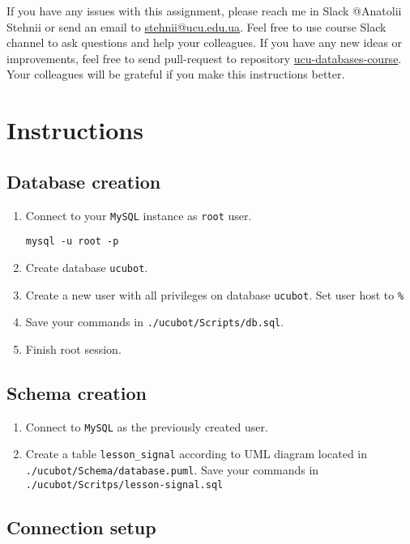 \documentclass[12pt]{article}
\newcommand{\code}[1]{\texttt{#1}}
\begin{document}
If you have any issues with this assignment, please reach me in Slack @Anatolii Stehnii or send an email to \href{mailto:stehnii@ucu.edu.ua}{stehnii@ucu.edu.ua}. Feel free to use course Slack channel to ask questions and help your colleagues. If you have any new ideas or improvements, feel free to send pull-request to repository \href{https://github.com/tsdaemon/ucu-databases-course}{ucu-databases-course}. Your colleagues will be grateful if you make this instructions better.

\section*{Instructions}
\subsection*{Database creation}

\begin{enumerate}
\item Connect to your \code{MySQL} instance as \code{root} user.
\begin{verbatim}
mysql -u root -p
\end{verbatim}
\item Create database \code{ucubot}.
\item Create a new user with all privileges on database \code{ucubot}. Set user host to \code{\%}
\item Save your commands in \code{./ucubot/Scripts/db.sql}.
\item Finish root session.
\end{enumerate}

\subsection*{Schema creation}

\begin{enumerate}
\item Connect to \code{MySQL} as the previously created user.
\item Create a table \code{lesson\_signal} according to UML diagram located in \break \code{./ucubot/Schema/database.puml}. Save your commands in \break \code{./ucubot/Scritps/lesson-signal.sql}
\end{enumerate}

\subsection*{Connection setup}
\end{document}
